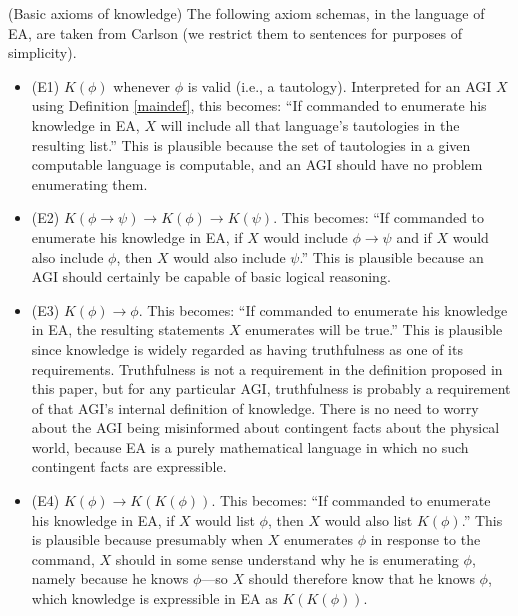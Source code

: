 \documentclass[runningheads]{llncs}
\begin{document}
\begin{example}
  (Basic axioms of knowledge) The following axiom schemas, in the language
  of EA, are taken from Carlson \cite{carlson}
  (we restrict them to sentences for purposes of simplicity).
  \begin{itemize}
    \item (E1) $K(\phi)$ whenever $\phi$ is valid (i.e., a tautology).
    Interpreted for an AGI $X$ using Definition \ref{maindef}, this becomes:
    ``If commanded to enumerate his knowledge in EA, $X$ will include
    all that language's tautologies in the resulting list.'' This is plausible
    because the set of tautologies in a given computable language is computable,
    and an AGI should have no problem enumerating them.
    \item (E2) $K(\phi\rightarrow\psi)\rightarrow K(\phi)\rightarrow K(\psi)$.
    This becomes: ``If commanded to enumerate his knowledge in EA,
    if $X$ would include $\phi\rightarrow\psi$ and if $X$ would also include
    $\phi$, then $X$ would also include $\psi$.'' This is plausible because
    an AGI should certainly be capable of basic logical reasoning.
    \item (E3) $K(\phi)\rightarrow\phi$. This becomes: ``If commanded to enumerate
    his knowledge in EA, the resulting statements $X$ enumerates
    will be true.'' This is plausible since knowledge is widely regarded as
    having truthfulness as one of its requirements. Truthfulness is not a
    requirement in the definition proposed in this paper, but for any particular
    AGI, truthfulness is probably a requirement of that AGI's internal definition
    of knowledge. There is no need to worry about the AGI being misinformed about
    contingent facts about the physical world, because EA is a purely mathematical
    language in which no such contingent facts are expressible.
    \item (E4) $K(\phi)\rightarrow K(K(\phi))$. This becomes: ``If commanded to
    enumerate his knowledge in EA, if $X$ would list $\phi$,
    then $X$ would also list $K(\phi)$.'' This is plausible because presumably
    when $X$ enumerates $\phi$ in response to the command, $X$ should in some sense
    understand why he is enumerating $\phi$, namely because he knows $\phi$---so $X$
    should therefore know that he knows $\phi$, which knowledge is expressible in
    EA as $K(K(\phi))$.
  \end{itemize}
\end{example}
\end{document}

